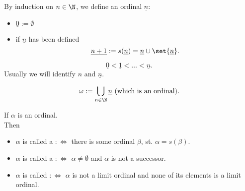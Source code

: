 \begin{notation}
    By induction on $n \in \N$, we define an ordinal $\underline{n}$:
    \begin{itemize}
        \item $\underline{0} := \emptyset$
        \item if $\underline{n}$ has been defined
        $$ \underline{n+1} := s(\underline{n}) = \underline{n} \cup \set{\underline{n}}.$$
    \end{itemize}
\end{notation}

\begin{remark}
    $$\underline{0} < \underline{1} < \ldots < \underline{n}.$$
    Usually we will identify $n$ and $\underline{n}$.
\end{remark}

\begin{definition}
    $$ \omega := \bigcup_{n \in \N}\underline{n} \text{ (which is an ordinal)}.$$
\end{definition}

\begin{definition}
    If $\alpha$ is an ordinal.\\
    Then 
    \begin{itemize}
        \item $\alpha$ is called a  $:\iff$ there is some ordinal $\beta$, st. $\alpha = s(\beta)$.
        \item $\alpha$ is called a  $:\iff$ $\alpha \ne \emptyset$ and $\alpha$ is not a successor.
        \item $\alpha$ is called  $:\iff$ $\alpha$ is not a limit ordinal and none of its elements is a limit ordinal.
    \end{itemize}
\end{definition}

